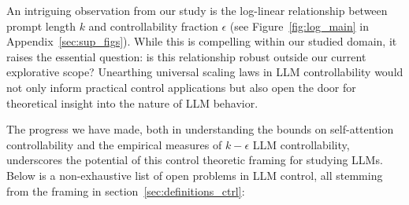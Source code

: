 \documentclass{article} %
\begin{document}
An intriguing observation from our study is the log-linear relationship between prompt length $k$ and controllability fraction $\epsilon$ (see Figure~\ref{fig:log_main} in Appendix~\ref{sec:sup_figs}). 
While this is compelling within our studied domain, it raises the essential question: is this relationship robust outside our current explorative scope? 
Unearthing universal scaling laws in LLM controllability would not only inform practical control applications but also open the door for theoretical insight into the nature of LLM behavior.


The progress we have made, both in understanding the bounds on self-attention controllability and the empirical measures of $k-\epsilon$ LLM controllability, underscores the potential of this control theoretic framing for studying LLMs. 
Below is a non-exhaustive list of open problems in LLM control, all stemming from the framing in section~\ref{sec:definitions_ctrl}: 
\end{document}
